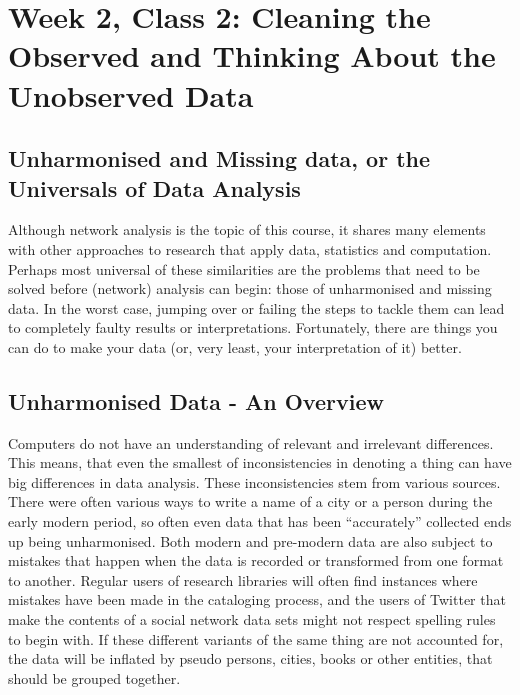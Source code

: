 \documentclass[
]{book}
\begin{document}
\hypertarget{week-2-class-2-cleaning-the-observed-and-thinking-about-the-unobserved-data}{%
\chapter{Week 2, Class 2: Cleaning the Observed and Thinking About the Unobserved Data}\label{week-2-class-2-cleaning-the-observed-and-thinking-about-the-unobserved-data}}

\hypertarget{unharmonised-and-missing-data-or-the-universals-of-data-analysis}{%
\section{Unharmonised and Missing data, or the Universals of Data Analysis}\label{unharmonised-and-missing-data-or-the-universals-of-data-analysis}}

Although network analysis is the topic of this course, it shares many elements with other approaches to research that apply data, statistics and computation. Perhaps most universal of these similarities are the problems that need to be solved before (network) analysis can begin: those of unharmonised and missing data. In the worst case, jumping over or failing the steps to tackle them can lead to completely faulty results or interpretations. Fortunately, there are things you can do to make your data (or, very least, your interpretation of it) better.

\hypertarget{unharmonised-data---an-overview}{%
\section{Unharmonised Data - An Overview}\label{unharmonised-data---an-overview}}

Computers do not have an understanding of relevant and irrelevant differences. This means, that even the smallest of inconsistencies in denoting a thing can have big differences in data analysis. These inconsistencies stem from various sources. There were often various ways to write a name of a city or a person during the early modern period, so often even data that has been ``accurately'' collected ends up being unharmonised. Both modern and pre-modern data are also subject to mistakes that happen when the data is recorded or transformed from one format to another. Regular users of research libraries will often find instances where mistakes have been made in the cataloging process, and the users of Twitter that make the contents of a social network data sets might not respect spelling rules to begin with. If these different variants of the same thing are not accounted for, the data will be inflated by pseudo persons, cities, books or other entities, that should be grouped together.
\end{document}
